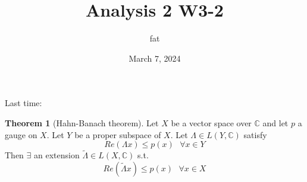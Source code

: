 \documentclass{article}
\title{Analysis 2 W3-2}
\author{fat}
\date{March 7, 2024}
\newcommand{\sfa}{\text{  } \forall}
\theoremstyle{definition}
\newtheorem{thm}{Theorem}
\begin{document}
\maketitle
\thispagestyle{fancy}
\renewcommand{\footrulewidth}{0.4pt}
\cfoot{\thepage}
\renewcommand{\headrulewidth}{0.4pt}

\par Last time:

\begin{thm}[Hahn-Banach theorem]
	Let $X$ be a vector space over $\mathbb{C}$ and let $p$ a gauge on $X$. Let $Y$ be a proper subspace of $X$.
	Let $\Lambda \in L(Y, \mathbb{C})$ satisfy
	\[
		Re(\Lambda x) \leq p(x) \sfa x \in Y
	\]
	Then $\exists$ an extension $\tilde{\Lambda} \in L(X, \mathbb{C})$ s.t.
	\[
		Re(\tilde{\Lambda} x) \leq p(x) \sfa x \in X
	\]
\end{thm}
\end{document}
